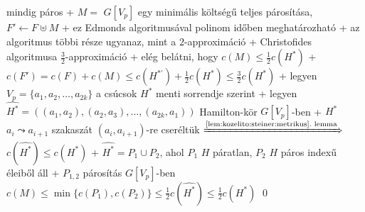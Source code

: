       mindig páros
  + $M = $ $G[V_p]$ egy minimális költségű teljes párosítása, $F'
    \gets F \uplus M$
    + ez Edmonds algoritmusával polinom időben meghatározható
  + az algoritmus többi része ugyanaz, mint a $2$-approximáció
  + \thm Christofides algoritmusa $\frac{3}{2}$-approximáció
    + \proof elég belátni, hogy $c(M) \le
      \frac{1}{2} c(H^*)$
      + \RA $c(F') = c(F) + c(M) \le c(H^{*\prime}) + \frac{1}{2} c(H^*)
        \le \frac{3}{2} c(H^*)$
    + legyen $V_p = \{ a_1, a_2, \ldots, a_{2k} \}$ a csúcsok $H^*$
      menti sorrendje szerint
    + legyen $\widehat{H^*} = ((a_1, a_2), (a_2, a_3), \ldots,
      (a_{2k}, a_1))$ Hamilton-kör $G[V_p]$-ben
      + $H^*$ $a_i \leadsto a_{i + 1}$ szakaszát $(a_i, a_{i + 1})$-re
        cseréltük
        $\xRightarrow{\text{\ref{lem:kozelito:steiner:metrikus}.~lemma}}$
        $c(\widehat{H^*}) \le c(H^*)$
    + $\widehat{H^*} = P_1 \cup P_2$, ahol $P_1$ $H$ páratlan, $P_2$
      $H$ páros indexű éleiből áll
    + $P_{1,2}$ párosítás $G[V_p]$-ben \RA $c(M) \le \min \{ c(P_1),
      c(P_2) \} \le \frac{1}{2} c(\widehat{H^*}) \le \frac{1}{2}
      c(H^*)$ \qed



